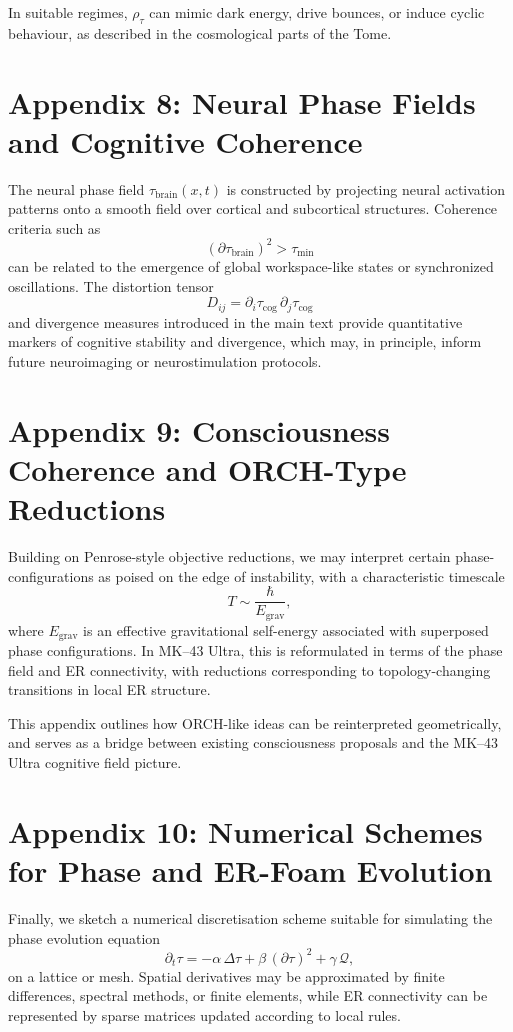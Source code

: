 In suitable regimes, \(\rho_\tau\) can mimic dark energy, drive bounces, or induce cyclic behaviour, as described in the cosmological parts of the Tome.

\chapter{Appendix 8: Neural Phase Fields and Cognitive Coherence}

The neural phase field \(\tau_{\mathrm{brain}}(x,t)\) is constructed by projecting neural activation patterns onto a smooth field over cortical and subcortical structures.
Coherence criteria such as
\[
(\partial\tau_{\mathrm{brain}})^2 > \tau_{\min}
\]
can be related to the emergence of global workspace-like states or synchronized oscillations.
The distortion tensor
\[
D_{ij} = \partial_i \tau_{\mathrm{cog}}\,\partial_j \tau_{\mathrm{cog}}
\]
and divergence measures introduced in the main text provide quantitative markers of cognitive stability and divergence, which may, in principle, inform future neuroimaging or neurostimulation protocols.

\chapter{Appendix 9: Consciousness Coherence and ORCH-Type Reductions}

Building on Penrose-style objective reductions, we may interpret certain phase-configurations as poised on the edge of instability, with a characteristic timescale
\[
T \sim \frac{\hbar}{E_{\mathrm{grav}}},
\]
where \(E_{\mathrm{grav}}\) is an effective gravitational self-energy associated with superposed phase configurations.
In MK--43 Ultra, this is reformulated in terms of the phase field and ER connectivity, with reductions corresponding to topology-changing transitions in local ER structure.

This appendix outlines how ORCH-like ideas can be reinterpreted geometrically, and serves as a bridge between existing consciousness proposals and the MK--43 Ultra cognitive field picture.

\chapter{Appendix 10: Numerical Schemes for Phase and ER-Foam Evolution}

Finally, we sketch a numerical discretisation scheme suitable for simulating the phase evolution equation
\[
\partial_t \tau = -\alpha\,\Delta\tau + \beta\,(\partial\tau)^2 + \gamma\,\mathcal{Q},
\]
on a lattice or mesh.
Spatial derivatives may be approximated by finite differences, spectral methods, or finite elements, while ER connectivity can be represented by sparse matrices updated according to local rules.

